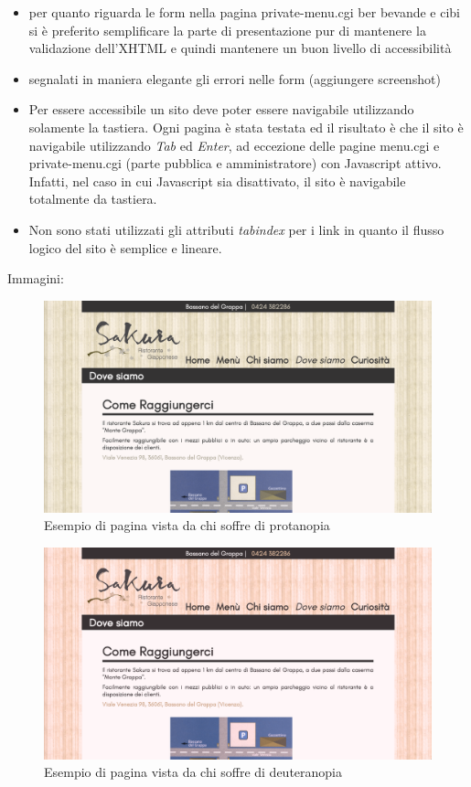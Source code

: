 \documentclass[../relazione.tex]{subfiles}
\begin{document}
\begin{itemize}
		\item per quanto riguarda le form nella pagina private-menu.cgi ber bevande e cibi si è preferito semplificare la parte di presentazione pur di mantenere la validazione dell’XHTML e quindi mantenere un buon livello di accessibilità
		\item segnalati in maniera elegante gli errori nelle form (aggiungere screenshot)
		\item Per essere accessibile un sito deve poter essere navigabile utilizzando solamente la tastiera. Ogni pagina è stata testata ed il risultato è che il sito è navigabile utilizzando \textit{Tab} ed \textit{Enter}, ad eccezione delle pagine menu.cgi e private-menu.cgi (parte pubblica e amministratore) con Javascript attivo. Infatti, nel caso in cui Javascript sia disattivato, il sito è navigabile totalmente da tastiera.
		\item Non sono stati utilizzati gli attributi \textit{tabindex} per i link in quanto il flusso logico del sito è semplice e lineare.
	\end{itemize}
	Immagini:
	\begin{figure}[H]
	\centering
		\includegraphics[width=\textwidth]{images/colorblindness/protanopia}
		\caption{Esempio di pagina vista da chi soffre di protanopia}
		\label{fig:Esempio di pagina vista da chi soffre di protanopia}
	\end{figure}
	\begin{figure}[H]
	\centering
		\includegraphics[width=\textwidth]{images/colorblindness/deuteranopia}
		\caption{Esempio di pagina vista da chi soffre di deuteranopia}
		\label{fig:Esempio di pagina vista da chi soffre di deuteranopia}
	\end{figure}
\end{document}
